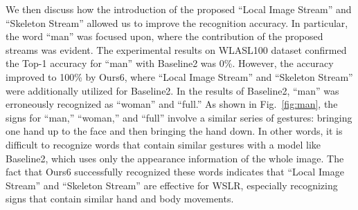 \documentclass[journal]{IEEEtran}
\begin{document}
We then discuss how the introduction of the proposed ``Local Image Stream'' and ``Skeleton Stream'' allowed us to improve the recognition accuracy.
In particular, the word ``man'' was focused upon, where the contribution of the proposed streams was evident.
The experimental results on WLASL100 dataset confirmed the Top-1 accuracy for ``man'' with Baseline2 was 0\%.
However, the accuracy improved to 100\% by Ours6, where ``Local Image Stream'' and ``Skeleton Stream'' were additionally utilized for Baseline2.
In the results of Baseline2, ``man'' was erroneously recognized as ``woman'' and ``full.''
As shown in Fig.~\ref{fig:man}, the signs for ``man,'' ``woman,'' and ``full'' involve a similar series of gestures: bringing one hand up to the face and then bringing the hand down.
In other words, it is difficult to recognize words that contain similar gestures with a model like Baseline2, which uses only the appearance information of the whole image.
The fact that Ours6 successfully recognized these words indicates that ``Local Image Stream'' and ``Skeleton Stream'' are effective for WSLR, especially recognizing signs that contain similar hand and body movements.
\end{document}
